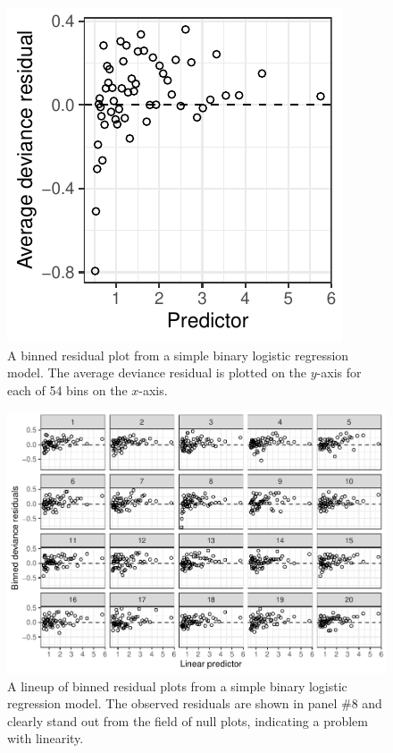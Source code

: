 \documentclass[12pt]{article}
\begin{document}
\begin{figure}
\centering
\includegraphics{binned_resid_example.pdf}
\caption{\label{fig:binned} A binned residual plot from a simple binary
logistic regression model. The average deviance residual is plotted on
the \(y\)-axis for each of 54 bins on the \(x\)-axis.}
\end{figure}

\begin{figure}
\centering
\includegraphics{wells_binned_residuals.pdf}
\caption{\label{fig:binnedlineup} A lineup of binned residual plots from
a simple binary logistic regression model. The observed residuals are
shown in panel \#8 and clearly stand out from the field of null plots,
indicating a problem with linearity.}
\end{figure}
\end{document}

